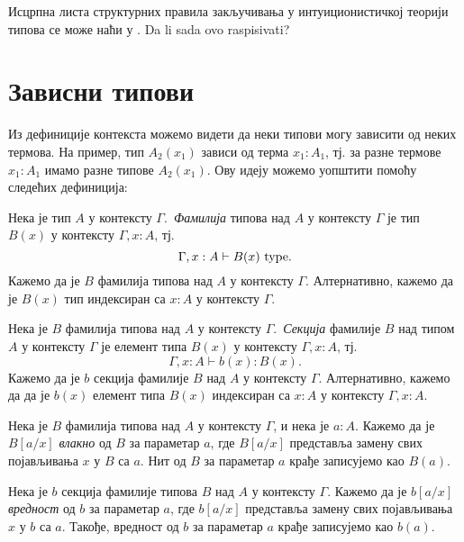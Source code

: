 \documentclass[12pt,oneside]{memoir}
\begin{document}
Исцрпна листа структурних правила закључивања у интуиционистичкој теорији типова се може наћи у \cite{rijke2022intro}. {\color{red}Da li sada ovo raspisivati?} 

\section{Зависни типови}

Из дефиниције контекста можемо видети да неки типови могу зависити од неких термова. На пример, тип $A_2(x_1)$ зависи од терма $x_1 : A_1$, тј. за разне термове $x_1 : A_1$ имамо разне типове $A_2(x_1)$. Ову идеју можемо уопштити помоћу следећих дефиниција:

\begin{definition}
    Нека је тип $A$ у контексту $\Gamma$.~\emph{Фамилија} типова над $A$ у контексту $\Gamma$ је тип $B(x)$ у контексту $\Gamma, x : A$, тј.
    \[\Gamma, x : A \vdash B(x)~{\mathrm{type}}.\]
    Кажемо да је $B$ фамилија типова над $A$ у контексту $\Gamma$. Алтернативно, кажемо да је $B(x)$ тип индексиран са $x : A$ у контексту $\Gamma$.
\end{definition}

\begin{definition}
    Нека је $B$ фамилија типова над $A$ у контексту $\Gamma$.~\emph{Секција} фамилије $B$ над типом $A$ у контексту $\Gamma$ је елемент типа $B(x)$ у контексту $\Gamma, x : A$, тј.
    \[\Gamma, x : A \vdash b(x) : B(x).\]
    Кажемо да је $b$ секција фамилије $B$ над $A$ у контексту $\Gamma$. Алтернативно, кажемо да да је $b(x)$ елемент типа $B(x)$ индексиран са $x : A$ у контексту $\Gamma, x : A$. 
\end{definition}

\begin{definition}
    Нека је $B$ фамилија типова над $A$ у контексту $\Gamma$, и нека је $a : A$. Кажемо да је $B[a/x]$ \emph{влакно} од $B$ за параметар $a$, где $B[a/x]$ представља замену свих појављивања $x$ у $B$ са $a$. Нит од $B$ за параметар $a$ крађе записујемо као $B(a)$.
\end{definition}

\begin{definition}
    Нека је $b$ секција фамилије типова $B$ над $A$ у контексту $\Gamma$. Кажемо да је $b[a/x]$ \emph{вредност} од $b$ за параметар $a$, где $b[a/x]$ представља замену свих појављивања $x$ у $b$ са $a$. Такође, вредност од $b$ за параметар $a$ крађе записујемо као $b(a)$.
\end{definition}
\end{document}
